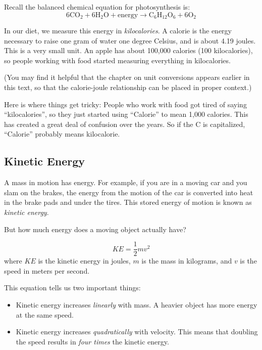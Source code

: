 Recall the balanced chemical equation for photosynthesis is:
\[
6 \text{CO}_2 + 6 \text{H}_2\text{O} + \text{energy} \rightarrow \text{C}_6\text{H}_{12}\text{O}_6 + 6 \text{O}_2
\]


In our diet, we measure this energy in \textit{kilocalories}. A calorie is the 
energy necessary to raise one gram of water one degree Celsius, and is about 
4.19 joules. This is a very small unit. An apple has about 100,000 calories (100 
kilocalories), so people working with food started measuring everything in kilocalories.

(You may find it helpful that the chapter on unit conversions appears earlier in this text, so that the calorie-joule relationship can be placed in proper context.) %

Here is where things get tricky: People who work with food got tired of saying 
``kilocalories'', so they just started using ``Calorie'' to mean 1,000 calories. 
This has created a great deal of confusion over the years. So if the C is capitalized,
 ``Calorie'' probably means kilocalorie.

\subsection{Kinetic Energy}
A mass in motion has energy. For example, if you are in a moving car and you slam
on the brakes, the energy from the motion of the car is converted into heat in
the brake pads and under the tires. This stored energy of motion is known as
\emph{kinetic energy}.

But how much energy does a moving object actually have?

\begin{mdframed}[style=important, frametitle={Formula for Kinetic Energy}]
\[
KE = \frac{1}{2} m v^2
\]
where $KE$ is the kinetic energy in joules, $m$ is the mass in kilograms, and
$v$ is the speed in meters per second.
\end{mdframed}

This equation tells us two important things:

\begin{itemize}
  \item Kinetic energy increases \emph{linearly} with mass. A heavier object has
  more energy at the same speed.
  \item Kinetic energy increases \emph{quadratically} with velocity. This means
  that doubling the speed results in \emph{four times} the kinetic energy.
\end{itemize}

